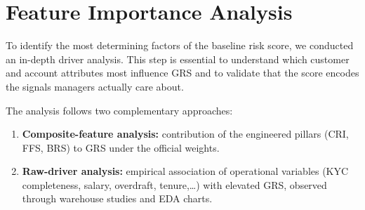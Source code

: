 \section{Feature Importance Analysis}
\label{sec:feature_importance}
To identify the most determining factors of the baseline risk score, we conducted
an in-depth driver analysis. This step is essential to understand which customer
and account attributes most influence GRS  and to validate that the score
encodes the signals managers actually care about.

The analysis follows two complementary approaches:
\begin{enumerate}
    \item \textbf{Composite-feature analysis:} contribution of the engineered pillars
          (CRI, FFS, BRS) to GRS under the official weights.
    \item \textbf{Raw-driver analysis:} empirical association of operational variables
          (KYC completeness, salary, overdraft, tenure,\ldots) with elevated GRS,
          observed through warehouse studies and EDA charts.
\end{enumerate}

